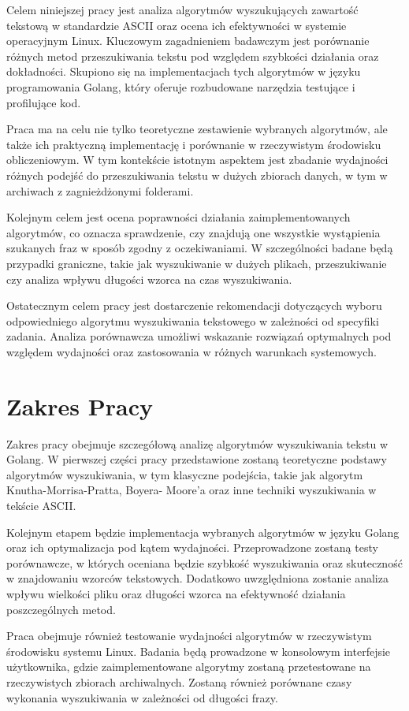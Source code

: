 Celem niniejszej pracy jest analiza algorytmów wyszukujących zawartość tekstową 
w standardzie ASCII oraz ocena ich efektywności w systemie operacyjnym Linux. 
Kluczowym zagadnieniem badawczym jest porównanie różnych metod przeszukiwania 
tekstu pod względem szybkości działania oraz dokładności. Skupiono się na 
implementacjach tych algorytmów w języku programowania Golang, który oferuje
rozbudowane narzędzia testujące i profilujące kod.

Praca ma na celu nie tylko teoretyczne zestawienie wybranych algorytmów, ale 
także ich praktyczną implementację i porównanie w rzeczywistym środowisku 
obliczeniowym. W tym kontekście istotnym aspektem jest zbadanie wydajności 
różnych podejść do przeszukiwania tekstu w dużych zbiorach danych, w tym w 
archiwach z zagnieżdżonymi folderami.

Kolejnym celem jest ocena poprawności działania zaimplementowanych algorytmów, 
co oznacza sprawdzenie, czy znajdują one wszystkie wystąpienia szukanych fraz w 
sposób zgodny z oczekiwaniami. W szczególności badane będą przypadki graniczne, 
takie jak wyszukiwanie w dużych plikach, przeszukiwanie czy analiza wpływu 
długości wzorca na czas wyszukiwania.

Ostatecznym celem pracy jest dostarczenie rekomendacji dotyczących wyboru 
odpowiedniego algorytmu wyszukiwania tekstowego w zależności od specyfiki 
zadania. Analiza porównawcza umożliwi wskazanie rozwiązań optymalnych pod 
względem wydajności oraz zastosowania w różnych warunkach systemowych.

\section{Zakres Pracy}
Zakres pracy obejmuje szczegółową analizę algorytmów wyszukiwania tekstu w Golang.
W pierwszej części pracy przedstawione zostaną teoretyczne podstawy algorytmów wyszukiwania,
w tym klasyczne podejścia, takie jak algorytm Knutha-Morrisa-Pratta, Boyera-
Moore'a oraz inne techniki wyszukiwania w tekście ASCII.

Kolejnym etapem będzie implementacja wybranych algorytmów w języku Golang oraz 
ich optymalizacja pod kątem wydajności. Przeprowadzone zostaną testy porównawcze, 
w których oceniana będzie szybkość wyszukiwania oraz skuteczność w znajdowaniu
wzorców tekstowych. Dodatkowo uwzględniona zostanie analiza wpływu wielkości
pliku oraz długości wzorca na efektywność działania poszczególnych metod.

Praca obejmuje również testowanie wydajności algorytmów w rzeczywistym 
środowisku systemu Linux. Badania będą prowadzone w konsolowym interfejsie 
użytkownika, gdzie zaimplementowane algorytmy zostaną przetestowane na 
rzeczywistych zbiorach archiwalnych. Zostaną również porównane czasy wykonania
wyszukiwania w zależności od długości frazy.

